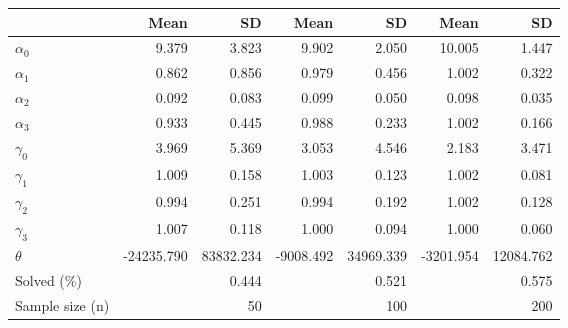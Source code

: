 
\begin{tabular}[t]{lrrrrrr}
\toprule
  & Mean & SD & Mean  & SD  & Mean   & SD  \\
\midrule
$\alpha_{0}$ & 9.379 & 3.823 & 9.902 & 2.050 & 10.005 & 1.447\\
$\alpha_{1}$ & 0.862 & 0.856 & 0.979 & 0.456 & 1.002 & 0.322\\
$\alpha_{2}$ & 0.092 & 0.083 & 0.099 & 0.050 & 0.098 & 0.035\\
$\alpha_{3}$ & 0.933 & 0.445 & 0.988 & 0.233 & 1.002 & 0.166\\
$\gamma_{0}$ & 3.969 & 5.369 & 3.053 & 4.546 & 2.183 & 3.471\\
$\gamma_{1}$ & 1.009 & 0.158 & 1.003 & 0.123 & 1.002 & 0.081\\
$\gamma_{2}$ & 0.994 & 0.251 & 0.994 & 0.192 & 1.002 & 0.128\\
$\gamma_{3}$ & 1.007 & 0.118 & 1.000 & 0.094 & 1.000 & 0.060\\
$\theta$ & -24235.790 & 83832.234 & -9008.492 & 34969.339 & -3201.954 & 12084.762\\
Solved (\%) &  & 0.444 &  & 0.521 &  & 0.575\\
Sample size (n) &  & 50 &  & 100 &  & 200\\
\bottomrule
\end{tabular}
